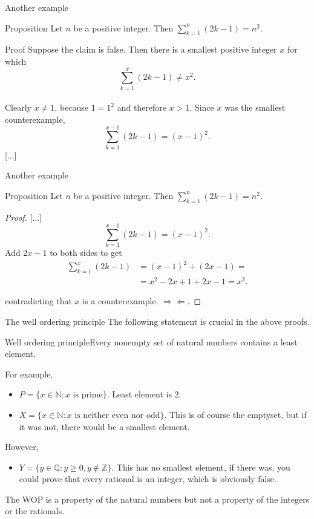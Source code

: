 \documentclass{beamer}
\def\bl[#1]#2{\begin{block}{#1}#2\end{block}}
\def\itemb{\begin{itemize}}
\def\iteme{\end{itemize}}
\begin{document}
\begin{frame}{Another example}
\bl[Proposition]{
Let $n$ be a positive integer. Then $\sum_{k=1}^n(2k-1)=n^2$.
}
\bl[Proof]{
Suppose the claim is false. Then there is a smallest positive integer $x$ for which\vspace{-0.7cm}
\[
\sum_{k=1}^x(2k-1)\neq x^2.
\]\vspace{-0.5cm}
\\
Clearly $x\neq 1$, because $1=1^2$ and therefore $x>1$. Since $x$ was the smallest counterexample,\vspace{-0.4cm}
\[
\sum_{k=1}^{x-1}(2k-1)= (x-1)^2.
\]
[...]
}
\end{frame}

\begin{frame}{Another example}
\bl[Proposition]{
Let $n$ be a positive integer. Then $\sum_{k=1}^n(2k-1)=n^2$.
}
\begin{proof}

[...]
\[
\sum_{k=1}^{x-1}(2k-1)= (x-1)^2.
\]
Add $2x-1$ to both sides to get\vspace{-0.3cm}
\begin{align*}
\sum_{k=1}^{x}(2k-1)&= (x-1)^2+(2x-1)=\\
&=x^2-2x+1+2x-1=x^2.
\end{align*}\vspace{-0.5cm}

contradicting that $x$ is a counterexample. $\Rightarrow\Leftarrow$.
\end{proof}
\end{frame}

\begin{frame}{The well ordering principle}
The following statement is crucial in the above proofs.
\bl[Well ordering principle]{Every nonempty set of natural numbers contains a least element.}
For example,
\itemb
\item $P=\{x\in\mathbb{N}: x\textrm{ is prime}\}$. Least element is $2$.
\item $X=\{x\in\mathbb{N}: x\textrm{ is neither even nor odd}\}$. This is of course the emptyset, but if it was not, there would be a smallest element.
\iteme
However,
\itemb
\item $Y=\{y\in\mathbb{Q}: y\geq 0, y\notin\mathbb{Z}\}$. This has no smallest element, if there was, you could prove that every rational is an integer, which is obviously false.
\iteme
The WOP is a property of the natural numbers but not a property of the integers or the rationals.
\end{frame}
\end{document}
